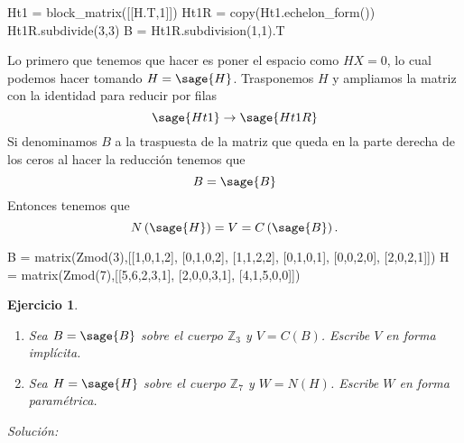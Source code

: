 \documentclass{amsart}
\newtheorem{ejer}{Ejercicio}
\begin{document}
\begin{sageblock}
Ht1 = block_matrix([[H.T,1]])
Ht1R = copy(Ht1.echelon_form())
Ht1R.subdivide(3,3)
B = Ht1R.subdivision(1,1).T
\end{sageblock}

Lo primero que tenemos que hacer es poner el espacio como $HX = 0$, lo cual
podemos hacer tomando $H = \sage{H}$.
Trasponemos $H$ y ampliamos la matriz con la identidad para reducir por filas
$$ \sage{Ht1} \to \sage{Ht1R} $$
Si denominamos $B$ a la traspuesta de la matriz que queda en la parte derecha 
de los ceros al hacer la reducción tenemos que
$$ B = \sage{B} $$
Entonces tenemos que
$$ N\left(\sage{H}\right) = V = C\left(\sage{B}\right).$$

\begin{sagecode}
B = matrix(Zmod(3),[[1,0,1,2],
[0,1,0,2],
[1,1,2,2],
[0,1,0,1],
[0,0,2,0],
[2,0,2,1]])
H = matrix(Zmod(7),[[5,6,2,3,1],
[2,0,0,3,1],
[4,1,5,0,0]])
\end{sagecode}

\begin{ejer}
\begin{enumerate}
\item Sea $B = \sage{B}$ sobre el cuerpo ${\mathbb Z}_3$ y $V = C(B)$. Escribe $V$
en forma implícita.
\item Sea $H = \sage{H}$ sobre el cuerpo ${\mathbb Z}_7$ y $W = N(H)$. Escribe $W$
en forma paramétrica.
\end{enumerate}
\end{ejer}

{\it Solución:}


\end{document}
